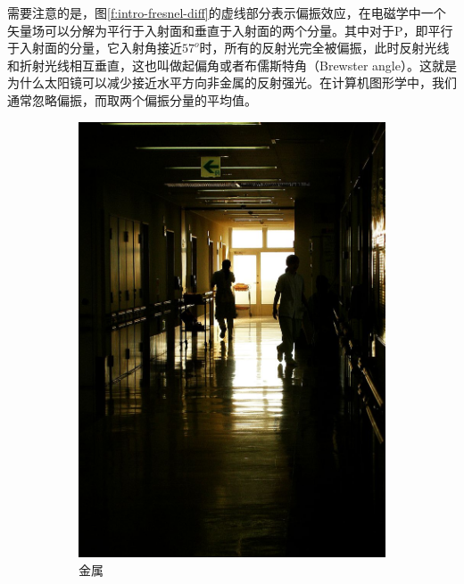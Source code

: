 需要注意的是，图\ref{f:intro-fresnel-diff}的虚线部分表示偏振效应，在电磁学中一个矢量场可以分解为平行于入射面和垂直于入射面的两个分量。其中对于P，即平行于入射面的分量，它入射角接近$57^o$时，所有的反射光完全被偏振，此时反射光线和折射光线相互垂直，这也叫做起偏角或者布儒斯特角（Brewster angle）。这就是为什么太阳镜可以减少接近水平方向非金属的反射强光。在计算机图形学中，我们通常忽略偏振，而取两个偏振分量的平均值。

\begin{figure}
	\begin{subfigure}[b]{0.5\textwidth}
		\includegraphics[width=1.\textwidth]{figures/intro/fresnel-3}
		\caption{金属}
	\end{subfigure}
	\begin{subfigure}[b]{0.5\textwidth}

\end{subfigure}
\end{figure}
